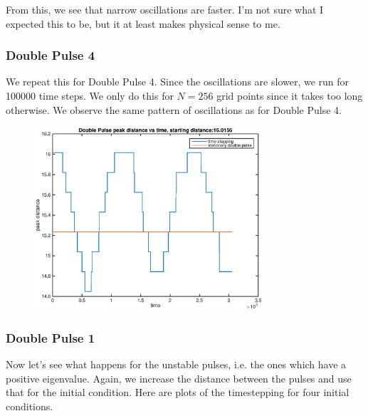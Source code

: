 \documentclass[12pt]{article}
\begin{document}
From this, we see that narrow oscillations are faster. I'm not sure what I expected this to be, but it at least makes physical sense to me.

\subsubsection*{Double Pulse 4}
We repeat this for Double Pulse 4. Since the oscillations are slower, we run for 100000 time steps. We only do this for $N=256$ grid points since it takes too long otherwise. We observe the same pattern of oscillations as for Double Pulse 4. 

\begin{figure}[H]
	\includegraphics[width=8.5cm]{2double2a_osc1_1024.eps}
\end{figure}

\subsubsection*{Double Pulse 1}
Now let's see what happens for the unstable pulses, i.e. the ones which have a positive eigenvalue. Again, we increase the distance between the pulses and use that for the initial condition. Here are plots of the timestepping for four initial conditions.
\end{document}
